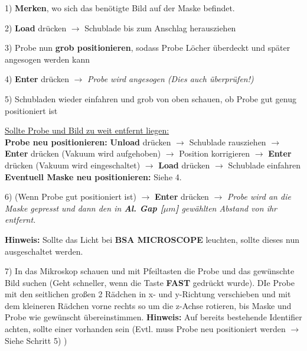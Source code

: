\documentclass[
  ngerman,
  twoside,
  captions=tableheading,
  BCOR=.5cm,
  fontsize=11,
  ]{scrreprt}
\begin{document}
\begin{description}
\item 1) \textbf{Merken}, wo sich das benötigte Bild auf der Maske befindet.

\item 2) \textbf{Load} drücken $\rightarrow$ Schublade bis zum Anschlag herausziehen

\item 3) Probe nun \textbf{grob positionieren}, sodass Probe Löcher überdeckt und später angesogen werden kann

\item 4) \textbf{Enter} drücken $\rightarrow$ \textit{Probe wird angesogen (Dies auch überprüfen!)}

\item 5) Schubladen wieder einfahren und grob von oben schauen, ob Probe gut genug positioniert ist\newline

\underline{Sollte Probe und Bild zu weit entfernt liegen:}\\ 
\textbf{Probe neu positionieren:} \textbf{Unload} drücken $\rightarrow$ Schublade rausziehen $\rightarrow$ \textbf{Enter} drücken (Vakuum wird aufgehoben) $\rightarrow$ Position korrigieren $\rightarrow$ \textbf{Enter} drücken (Vakuum wird eingeschaltet) $\rightarrow$ \textbf{Load} drücken $\rightarrow$ Schublade einfahren\\
\textbf{Eventuell Maske neu positionieren:} Siehe 4.

\item 6) (Wenn Probe gut positioniert ist) $\rightarrow$ \textbf{Enter} drücken \newline 
$\rightarrow$ \textit{Probe wird an die Maske gepresst und dann den in \textbf{Al. Gap [$\mu m$]} gewählten Abstand von ihr entfernt.}

\textbf{Hinweis:} Sollte das Licht bei \textbf{BSA MICROSCOPE} leuchten,  sollte dieses nun ausgeschaltet werden.

\item 7) In das Mikroskop schauen und mit Pfeiltasten die Probe und das gewünschte Bild suchen (Geht schneller, wenn die Taste \textbf{FAST} gedrückt wurde). DIe Probe mit den seitlichen großen 2 Rädchen in x- und y-Richtung verschieben und mit dem kleineren Rädchen vorne rechts so um die z-Achse rotieren, bis Maske und Probe wie gewünscht übereinstimmen.\newline
\textbf{Hinweis:} Auf bereits bestehende Identifier achten, sollte einer vorhanden sein (Evtl. muss Probe neu positioniert werden $\rightarrow$ Siehe Schritt 5) )


\end{description}
\end{document}
